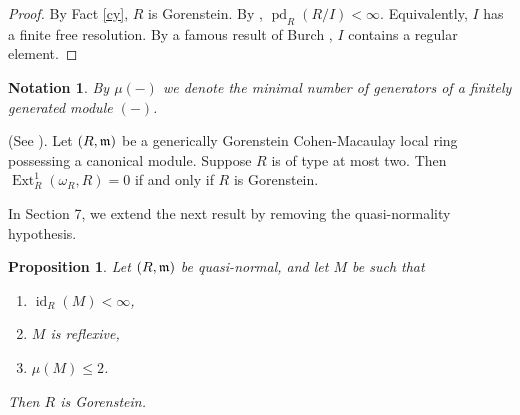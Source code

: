 \documentclass[10. pt,a4paper]{amsart}
\newtheorem{proposition}[theorem]{Proposition}
\newtheorem{notation}[theorem]{Notation}
\theoremstyle{definition}
\theoremstyle{remark}
\newcommand{\id}{\operatorname{id}}
\newcommand{\pd}{\operatorname{pd}}
\newcommand{\Ext}{\operatorname{Ext}}
\newcommand{\fm}{\frak{m}}
\begin{document}
\begin{proof}
	By Fact \ref{cy}, $R$ is Gorenstein. By \cite[3.1.25]{BH}, $\pd_R(R/I) < \infty$. Equivalently, $I$ has a finite free resolution. By a famous result of Burch \cite[Corollary 1.4.7]{BH}, $I$ contains a regular element.
\end{proof}

\begin{notation}
	By $\mu(-)$ we denote the minimal number of generators of a finitely generated module $(-)$.
\end{notation}
		\begin{fact}\label{fst} (See  \cite[Section 5.3]{finitsup}). Let  $(R,\fm)$ be a  generically Gorenstein  Cohen-Macaulay local ring  possessing a canonical module.  Suppose $R$  is  of type at most two. Then $\Ext^1_R(\omega_R,R) =0$
	if and only if $R$ is Gorenstein. 
\end{fact}
In Section 7, we extend the next result by removing the quasi-normality hypothesis.

\begin{proposition}
	Let $(R,\fm)$ be quasi-normal, and let $M$ be such that
	\begin{enumerate}
		\item[(i)] $\id_R(M) < \infty$,
		\item[(ii)] $M$ is reflexive,
		\item[(iii)] $\mu(M) \leq 2$.
	\end{enumerate}
	Then $R$ is Gorenstein.
\end{proposition}
\end{document}
